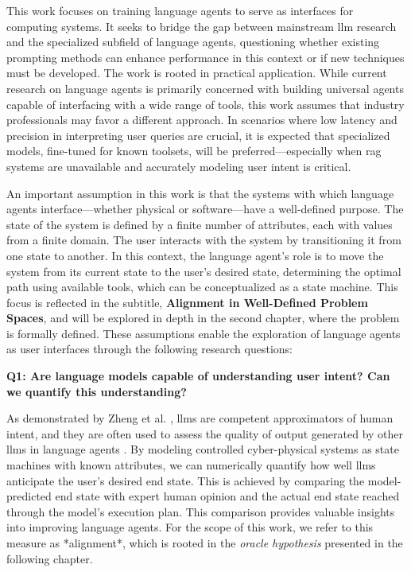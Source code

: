 \pskip

This work focuses on training language agents to serve as interfaces for computing systems. It seeks to bridge the gap between mainstream \gls{llm} research and the specialized subfield of language agents, questioning whether existing prompting methods can enhance performance in this context or if new techniques must be developed. The work is rooted in practical application. While current research on language agents is primarily concerned with building universal agents capable of interfacing with a wide range of tools, this work assumes that industry professionals may favor a different approach. In scenarios where low latency and precision in interpreting user queries are crucial, it is expected that specialized models, fine-tuned for known toolsets, will be preferred—especially when \gls{rag} systems are unavailable and accurately modeling user intent is critical.

\pskip

An important assumption in this work is that the systems with which language agents interface—whether physical or software—have a well-defined purpose. The state of the system is defined by a finite number of attributes, each with values from a finite domain. The user interacts with the system by transitioning it from one state to another. In this context, the language agent's role is to move the system from its current state to the user's desired state, determining the optimal path using available tools, which can be conceptualized as a state machine. This focus is reflected in the subtitle, \textbf{Alignment in Well-Defined Problem Spaces}, and will be explored in depth in the second chapter, where the problem is formally defined. These assumptions enable the exploration of language agents as user interfaces through the following research questions:

\pskip

\textbf{Q1: Are language models capable of understanding user intent? Can we quantify this understanding?}

\vskip 0.1in

As demonstrated by Zheng et al. \cite{zheng2023judgingllmasajudgemtbenchchatbot}, \glspl{llm} are competent approximators of human intent, and they are often used to assess the quality of output generated by other \glspl{llm} in language agents \cite{qin2023toolllmfacilitatinglargelanguage}. By modeling controlled cyber-physical systems as state machines with known attributes, we can numerically quantify how well \glspl{llm} anticipate the user's desired end state. This is achieved by comparing the model-predicted end state with expert human opinion and the actual end state reached through the model’s execution plan. This comparison provides valuable insights into improving language agents. For the scope of this work, we refer to this measure as *alignment*, which is rooted in the \textit{oracle hypothesis} presented in the following chapter.

